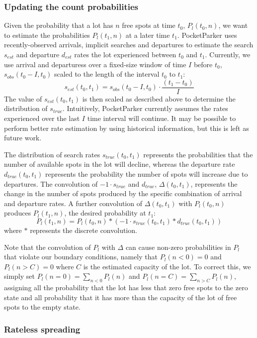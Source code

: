 \subsubsection{Updating the count probabilities}

Given the probability that a lot has $n$ free spots at time $t_0$, $P_l(t_0,
n)$, we want to estimate the probabilities $P_l(t_1, n)$ at a later time
$t_1$. PocketParker uses recently-observed arrivals, implicit searches and
departures to estimate the search $s_{est}$ and departure $d_{est}$ rates the
lot experienced between $t_0$ and $t_1$. Currently, we use arrival and
departuress over a fixed-size window of time $I$ before $t_0$, $s_{obs}(t_0 -
I, t_0)$ scaled to the length of the interval $t_0$ to $t_1$:
%
\[s_{est}(t_0, t_1) = s_{obs}(t_0 - I, t_0) \cdot \frac{(t_1 - t_0)}{I} \]
%
The value of $s_{est}(t_0, t_1)$ is then scaled as described above to
determine the distribution of $s_{true}$. Intuitively, PocketParker currently
assumes the rates experienced over the last $I$ time interval will continue.
It may be possible to perform better rate estimation by using historical
information, but this is left as future work.

The distribution of search rates $s_{true}(t_0, t_1)$ represents the
probabilities that the number of available spots in the lot will decline,
whereas the departure rate $d_{true}(t_0, t_1)$ represents the probability
the number of spots will increase due to departures. The convolution of $-1
\cdot s_{true}$ and $d_{true}$, $\Delta(t_0, t_1)$, represents the change in
the number of spots produced by the specific combination of arrival and
departure rates. A further convolution of $\Delta(t_0, t_1)$ with $P_l(t_0,
n)$ produces $P_l(t_1, n)$, the desired probability at $t_1$:
%
\[ P_l(t_1, n) = P_l(t_0, n) * (-1 \cdot s_{true}(t_0, t_1) * d_{true}(t_0,
t_1)) \]
%
where $*$ represents the discrete convolution.

Note that the convolution of $P_l$ with $\Delta$ can cause non-zero
probabilities in $P_l$ that violate our boundary conditions, namely that
$P_l(n < 0) = 0$ and $P_l(n > C) = 0$ where $C$ is the estimated capacity of
the lot. To correct this, we simply set $P_l(n = 0) = \sum_{n < 0} P_l(n)$
and $P_l(n = C) = \sum_{n > C} P_l(n)$, assigning all the probability that
the lot has less that zero free spots to the zero state and all probability
that it has more than the capacity of the lot of free spots to the empty
state.

\subsubsection{Rateless spreading}

